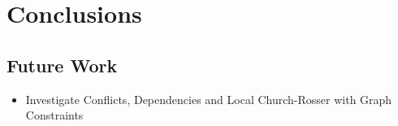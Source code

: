 \chapter{Conclusions}

\section{Future Work}

\begin{itemize}
  \item Investigate Conflicts, Dependencies and Local Church-Rosser with Graph Constraints
\end{itemize}
